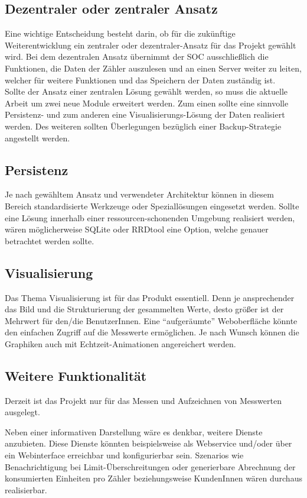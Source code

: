 \documentclass[Bachelorarbeit.tex]{subfiles}
\begin{document}
\subsection*{Dezentraler oder zentraler Ansatz}
Eine wichtige Entscheidung besteht darin, ob für die zukünftige Weiterentwicklung ein zentraler oder dezentraler-Ansatz für das Projekt gewählt wird. 
Bei dem dezentralen Ansatz übernimmt der \ac{SOC} ausschließlich die Funktionen, die Daten der Zähler auszulesen und an einen Server weiter zu leiten, welcher für weitere Funktionen und das Speichern der Daten zuständig ist. \\
Sollte der Ansatz einer zentralen Lösung gewählt werden, so muss die aktuelle Arbeit um zwei neue Module erweitert werden. Zum einen sollte eine sinnvolle Persistenz- und zum anderen eine Visualisierungs-Lösung der Daten realisiert werden. Des weiteren sollten Überlegungen bezüglich einer Backup-Strategie angestellt werden.

\subsection*{Persistenz} 
Je nach gewähltem Ansatz und verwendeter Architektur können in diesem Bereich standardisierte Werkzeuge oder Speziallösungen eingesetzt werden. 
Sollte eine Lösung innerhalb einer ressourcen-schonenden Umgebung realisiert werden, wären möglicherweise SQLite oder RRDtool \parencite[siehe:][]{rrd_tool} eine Option, welche genauer betrachtet werden sollte.

\subsection*{Visualisierung}  
Das Thema Visualisierung ist für das Produkt essentiell. 
Denn je ansprechender das Bild und die Strukturierung der gesammelten Werte, desto größer ist der Mehrwert für den/die BenutzerInnen.
Eine "`aufgeräumte"' Weboberfläche könnte den einfachen Zugriff auf die Messwerte ermöglichen. 
Je nach Wunsch können die Graphiken auch mit Echtzeit-Animationen angereichert werden.
 
\subsection*{Weitere Funktionalität}
Derzeit ist das Projekt nur für das Messen und Aufzeichnen von Messwerten ausgelegt. 

Neben einer informativen Darstellung wäre es denkbar, weitere Dienste anzubieten. 
Diese Dienste könnten beispielsweise als Webservice 
und/oder über ein Webinterface erreichbar und konfigurierbar sein.
Szenarios wie Benachrichtigung bei Limit-Überschreitungen oder generierbare Abrechnung der konsumierten Einheiten pro Zähler beziehungsweise KundenInnen wären durchaus realisierbar.  
\end{document}
